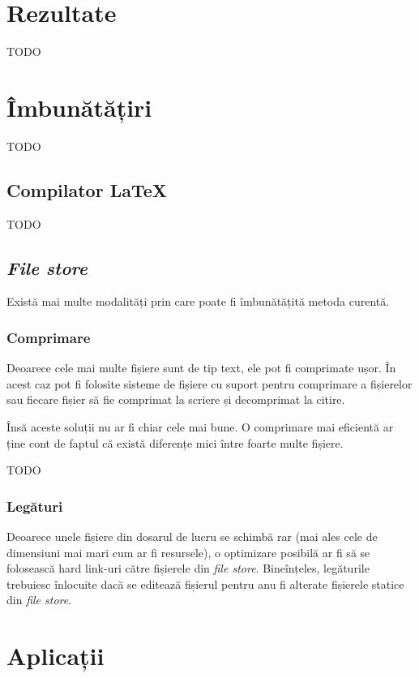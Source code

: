 \documentclass[a4wide,12pt]{report}
\newcommand{\eng}[1]{\emph{#1}} %
\newcommand{\idee}[1]{{\color{red} #1}}
\begin{document}
\chapter{Rezultate}

\idee{TODO}

\chapter{Îmbunătățiri}

\idee{TODO}

\section{Compilator \LaTeX}
\label{comlatsec}

\idee{TODO}

\section{\eng{File store}}
\label{filestoresec}

Există mai multe modalități prin care poate fi îmbunătățită metoda curentă.

\subsection{Comprimare}

Deoarece cele mai multe fișiere sunt de tip text, ele pot fi comprimate ușor.
În acest caz pot fi folosite sisteme de fișiere cu suport pentru comprimare
a fișierelor sau fiecare fișier să fie comprimat la scriere și decomprimat la
citire.

Însă aceste soluții nu ar fi chiar cele mai bune. O comprimare mai eficientă
ar ține cont de faptul că există diferențe mici între foarte multe fișiere.

\idee{TODO}

\subsection{Legături}

Deoarece unele fișiere din dosarul de lucru se schimbă rar (mai ales cele
de dimensiuni mai mari cum ar fi resursele), o optimizare posibilă ar fi să se
folosească hard link-uri către fișierele din \eng{file store}. Bineînțeles,
legăturile trebuiesc înlocuite dacă se editează fișierul pentru anu fi alterate
fișierele statice din \eng{file store}.

\chapter{Aplicații}
\end{document}
